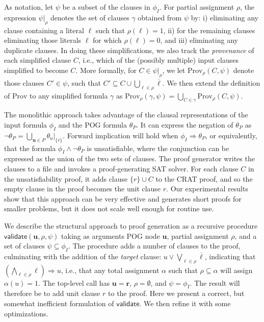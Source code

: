 \documentclass[letterpaper,USenglish,cleveref, autoref, thm-restate]{lipics-v2021}
\newcommand{\obar}[1]{\overline{#1}}
\newcommand{\lit}{\ell}
\newcommand{\imply}{\Rightarrow}
\newcommand{\assign}{\alpha}
\newcommand{\passign}{\rho}
\newcommand{\validate}{\textsf{validate}}
\newcommand{\prov}{\textrm{Prov}}
\newcommand{\inputformula}{\phi_I}
\newcommand{\pogformula}{\theta_P}
\newcommand{\makenode}[1]{\mathbf{#1}}
\newcommand{\nodeu}{\makenode{u}}
\newcommand{\noder}{\makenode{r}}
\newcommand{\simplify}[2]{#1|_{#2}}
\begin{document}
As notation,
let $\psi$ be a subset of the clauses in $\inputformula$.
For partial assignment
$\passign$, the expression  $\simplify{\psi}{\passign}$ denotes the set of clauses $\gamma$
obtained from $\psi$ by: i) eliminating any
clause containing a literal $\lit$ such that $\passign(\lit) = 1$,
ii) for the remaining clauses eliminating those literals $\lit$ for
which $\passign(\lit) = 0$, and iii) eliminating any duplicate clauses.
In doing these simplifications, we also track the {\em provenance}
of each simplified clause $C$, i.e., which of the (possibly multiple) input clauses simplified to become $C$.
More formally, for $C \in \simplify{\psi}{\passign}$, we let $\prov_{\passign}(C, \psi)$ denote
those clauses $C' \in \psi$, such that
$C' \subseteq C \cup \bigcup_{\lit \in \passign} \obar{\lit}$.
We then extend the definition of $\prov$ to any simplified formula
$\gamma$ as $\prov_{\passign}(\gamma, \psi) = \bigcup_{C \in \gamma} \prov_{\passign}(C, \psi)$.

The monolithic approach
takes advantage of the clausal representations of
the input formula $\inputformula$ and the POG formula $\pogformula$.
It can
express the negation of $\pogformula$ as $\neg \pogformula = \bigcup_{\nodeu\in P} \simplify{\theta_{u}}{\{\obar{r}\}}$.
Forward implication
will hold
when $\inputformula \imply \pogformula$, or  equivalently,
that the formula $\inputformula \land \neg \pogformula$
is unsatisfiable, where the
conjunction can be expressed as the union
of the two sets of clauses.  The proof generator writes the clauses to a file and invokes a proof-generating SAT solver.
For each clause $C$ in the unsatisfiability proof, it adds clause $\{r\} \cup C$ to the CRAT proof, and so the empty clause in the proof becomes the unit clause $r$.
Our experimental results show
that this approach can be very effective and generates short proofs
for smaller problems, but it does not scale well enough for routine
use.


We describe the structural approach to proof generation as a recursive procedure
$\validate(\nodeu, \passign, \psi)$ taking as arguments POG
node $\nodeu$, partial assignment
$\passign$, and a set of clauses $\psi \subseteq \inputformula$.
The procedure adds a number of clauses to the proof, culminating with
the addition of the {\em target} clause:
$u \lor \bigvee_{\lit \in \passign} \obar{\lit}$, indicating
that $(\bigwedge_{\lit \in \passign} \lit) \imply u$, i.e.,
that any total
assignment $\assign$ such that $\passign \subseteq \assign$
will assign $\assign(u) = 1$.
The top-level call has $\nodeu = \noder$, $\passign = \emptyset$, and $\psi = \inputformula$.
The result will therefore be to add unit clause $r$ to the proof.
Here we present a correct, but somewhat inefficient formulation of
$\validate$.  We then refine it with some optimizations.
\end{document}
